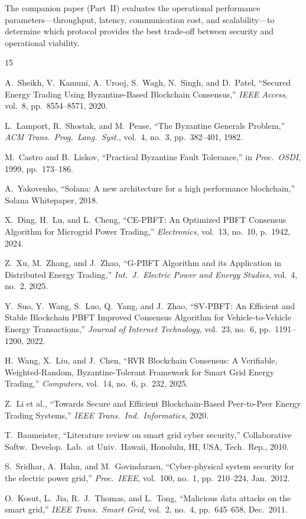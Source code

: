 \documentclass[10pt,twocolumn,letterpaper]{article}
\begin{document}
The companion paper (Part~II) evaluates the operational performance parameters---throughput, latency, communication cost, and scalability---to determine which protocol provides the best trade-off between security and operational viability.


\begin{thebibliography}{15}

A.~Sheikh, V.~Kamuni, A.~Urooj, S.~Wagh, N.~Singh, and D.~Patel,
``Secured Energy Trading Using Byzantine-Based Blockchain Consensus,''
\emph{IEEE Access}, vol.~8, pp.~8554--8571, 2020.

L.~Lamport, R.~Shostak, and M.~Pease,
``The Byzantine Generals Problem,''
\emph{ACM Trans.\ Prog.\ Lang.\ Syst.}, vol.~4, no.~3, pp.~382--401, 1982.

M.~Castro and B.~Liskov,
``Practical Byzantine Fault Tolerance,''
in \emph{Proc.\ OSDI}, 1999, pp.~173--186.

A.~Yakovenko,
``Solana: A new architecture for a high performance blockchain,''
Solana Whitepaper, 2018.

X.~Ding, H.~Lu, and L.~Cheng,
``CE-PBFT: An Optimized PBFT Consensus Algorithm for Microgrid Power Trading,''
\emph{Electronics}, vol.~13, no.~10, p.~1942, 2024.

Z.~Xu, M.~Zhang, and J.~Zhao,
``G-PBFT Algorithm and its Application in Distributed Energy Trading,''
\emph{Int.\ J.\ Electric Power and Energy Studies}, vol.~4, no.~2, 2025.

Y.~Suo, Y.~Wang, S.~Luo, Q.~Yang, and J.~Zhao,
``SV-PBFT: An Efficient and Stable Blockchain PBFT Improved Consensus Algorithm for Vehicle-to-Vehicle Energy Transactions,''
\emph{Journal of Internet Technology}, vol.~23, no.~6, pp.~1191--1200, 2022.

H.~Wang, X.~Liu, and J.~Chen,
``RVR Blockchain Consensus: A Verifiable, Weighted-Random, Byzantine-Tolerant Framework for Smart Grid Energy Trading,''
\emph{Computers}, vol.~14, no.~6, p.~232, 2025.

Z.~Li et al.,
``Towards Secure and Efficient Blockchain-Based Peer-to-Peer Energy Trading Systems,''
\emph{IEEE Trans.\ Ind.\ Informatics}, 2020.

T.~Baumeister,
``Literature review on smart grid cyber security,''
Collaborative Softw.\ Develop.\ Lab.\ at Univ.\ Hawaii, Honolulu, HI, USA, Tech.\ Rep., 2010.

S.~Sridhar, A.~Hahn, and M.~Govindarasu,
``Cyber-physical system security for the electric power grid,''
\emph{Proc.\ IEEE}, vol.~100, no.~1, pp.~210--224, Jan.~2012.

O.~Kosut, L.~Jia, R.~J.~Thomas, and L.~Tong,
``Malicious data attacks on the smart grid,''
\emph{IEEE Trans.\ Smart Grid}, vol.~2, no.~4, pp.~645--658, Dec.~2011.

\end{thebibliography}
\end{document}
